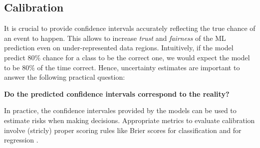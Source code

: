 \subsection{Calibration}

It is crucial to provide confidence intervals accurately reflecting the true chance of an event to happen. This allows to increase \emph{trust} and \emph{fairness} of the ML prediction even on under-represented data regions. Intuitively, if the model predict $80\%$ chance for a class to be the correct one, we would expect the model to be $80\%$ of the time correct. Hence, uncertainty estimates are important to answer the following practical question:

\begin{center}
    \textbf{Do the predicted confidence intervals correspond to the reality?}
\end{center}

In practice, the confidence intervales provided by the models can be used to estimate risks when making decisions. Appropriate metrics to evaluate calibration involve (stricly) proper scoring rules like Brier scores for classification and  for regression .